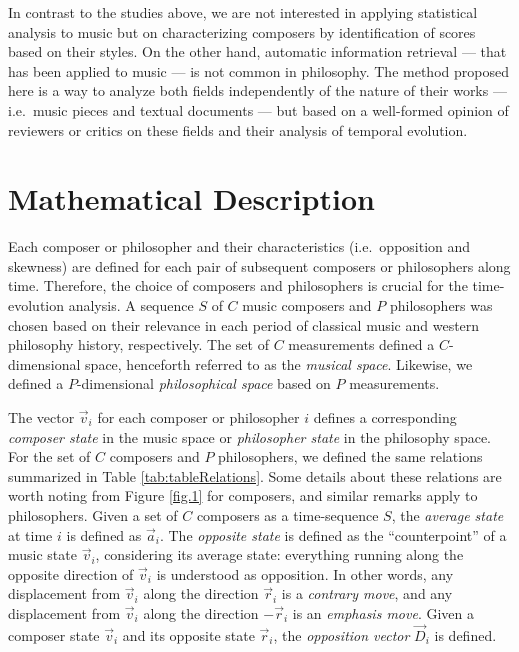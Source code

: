 \documentclass[
 aip,
 jmp,
 amsmath,amssymb,
 reprint,
]{revtex4-1}
\begin{document}
In contrast to the studies above, we are not interested in applying
statistical analysis to music but on characterizing composers by
identification of scores based on their styles. On the other hand,
automatic information retrieval --- that has been applied to music ---
is not common in philosophy. The method proposed here is a way to
analyze both fields independently of the nature of their works ---
i.e.\ music pieces and textual documents --- but based on a
well-formed opinion of reviewers or critics on these fields and their
analysis of temporal evolution.

\section{Mathematical Description}

Each composer or philosopher and their characteristics
(i.e.\ opposition and skewness) are defined for each pair of
subsequent composers or philosophers along time. Therefore, the choice
of composers and philosophers is crucial for the time-evolution
analysis.  A sequence $S$ of $C$ music composers and $P$ philosophers
was chosen based on their relevance in each period of classical music
and western philosophy history, respectively. The set of $C$
measurements defined a $C$-dimensional space, henceforth referred to
as the \emph{musical space}. Likewise, we defined a $P$-dimensional
\emph{philosophical space} based on $P$ measurements.

The vector $\vec{v}_i$ for each composer or philosopher $i$ defines a
corresponding \emph{composer state} in the music space or
\emph{philosopher state} in the philosophy space. For the set of $C$
composers and $P$ philosophers, we defined the same relations
summarized in Table \ref{tab:tableRelations}. Some details about these
relations are worth noting from Figure \ref{fig.1} for composers, and
similar remarks apply to philosophers. Given a set of $C$ composers as
a time-sequence $S$, the \emph{average state} at time $i$ is defined
as $\vec{a}_i$. The \emph{opposite state} is defined as the
``counterpoint'' of a music state $\vec{v}_i$, considering its average
state: everything running along the opposite direction of $\vec{v}_i$
is understood as opposition. In other words, any displacement from
$\vec{v}_i$ along the direction $\vec{r}_i$ is a \emph{contrary move},
and any displacement from $\vec{v}_i$ along the direction $-\vec{r}_i$
is an \emph{emphasis move}. Given a composer state $\vec{v}_i$ and its
opposite state $\vec{r}_i$, the \emph{opposition vector} $\vec{D}_i$
is defined.
\end{document}
